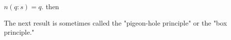 $n(q: s) = q$. then

The next result is sometimes called the "pigeon-hole principle" or the "box principle."
